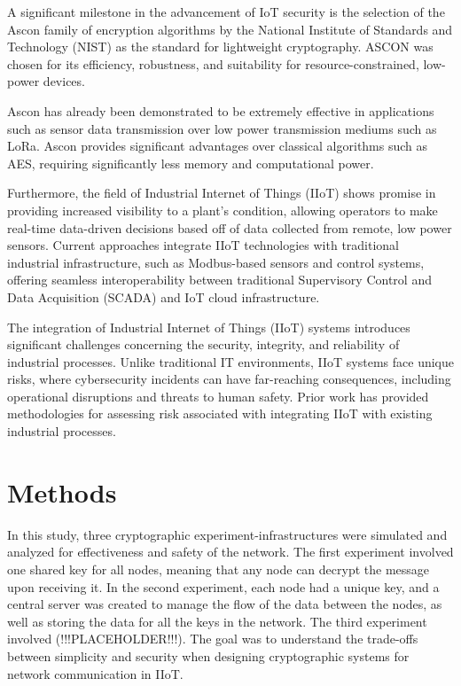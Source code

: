 \documentclass[journal]{IEEEtran}
\begin{document}
A significant milestone in the advancement of IoT security is the selection of the Ascon family of encryption algorithms by the National Institute of Standards and Technology (NIST) as the standard for lightweight cryptography. ASCON was chosen for its efficiency, robustness, and suitability for resource-constrained, low-power devices. \cite{NISTAsconAnnouncement}

Ascon has already been demonstrated to be extremely effective in applications such as sensor data transmission over low power transmission mediums such as LoRa. Ascon provides significant advantages over classical algorithms such as AES, requiring significantly less memory and computational power. \cite{AsconLoRa}

Furthermore, the field of Industrial Internet of Things (IIoT) shows promise in providing increased visibility to a plant's condition, allowing operators to make real-time data-driven  decisions based off of data collected from remote, low power sensors. Current approaches integrate IIoT technologies with traditional industrial infrastructure, such as Modbus-based sensors and control systems, offering seamless interoperability between traditional Supervisory Control and Data Acquisition (SCADA) and IoT cloud infrastructure. \cite{NuratchIIoT}

The integration of Industrial Internet of Things (IIoT) systems introduces significant challenges concerning the security, integrity, and reliability of industrial processes. Unlike traditional IT environments, IIoT systems face unique risks, where cybersecurity incidents can have far-reaching consequences, including operational disruptions and threats to human safety. Prior work has provided methodologies for assessing risk associated with integrating IIoT with existing industrial processes. \cite{SecurityIIoT}

\section{Methods}

In this study, three cryptographic experiment-infrastructures were simulated and analyzed for effectiveness and safety of the network. The first experiment involved one shared key for all nodes, meaning that any node can decrypt the message upon receiving it. In the second experiment, each node had a unique key, and a central server was created to manage the flow of the data between the nodes, as well as storing the data for all the keys in the network. The third experiment involved (!!!PLACEHOLDER!!!). The goal was to understand the trade-offs between simplicity and security when designing cryptographic systems for network communication in IIoT.
\end{document}
